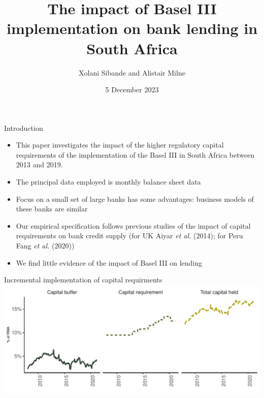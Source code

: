 \documentclass[
  14,
  ignorenonframetext,
  aspectratio=141,
]{beamer}
\title{The impact of Basel III implementation on bank lending in South
Africa}
\author{Xolani Sibande and Alistair Milne}
\date{5 December 2023}
\institute{South African Reserve Bank and Loughborough University}
\providecommand{\tightlist}{%
  \setlength{\itemsep}{0pt}\setlength{\parskip}{0pt}}
\begin{document}
\frame{\titlepage}

\begin{frame}{Introduction}
\protect\hypertarget{introduction}{}
\begin{itemize}
\tightlist
\item
  This paper investigates the impact of the higher regulatory capital
  requirements of the implementation of the Basel III in South Africa
  between 2013 and 2019.
\item
  The principal data employed is monthly balance sheet data
\item
  Focus on a small set of large banks has some advantages: business
  models of these banks are similar
\item
  Our empirical specification follows previous studies of the impact of
  capital requirements on bank credit supply (for UK Aiyar \emph{et al.}
  (2014); for Peru Fang \emph{et al.} (2020))
\item
  We find little evidence of the impact of Basel III on lending
\end{itemize}
\end{frame}

\begin{frame}{Incremental implementation of capital requirments}
\protect\hypertarget{incremental-implementation-of-capital-requirments}{}
\includegraphics{baseIII_and_bank_lending_files/figure-beamer/capital-1.pdf}
\end{frame}
\end{document}
